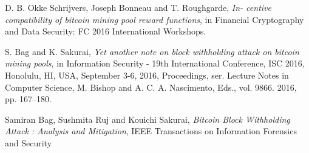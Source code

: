 \documentclass[12pt]{article}
\begin{document}
\begin{thebibliography}{9}
 D. B. Okke Schrijvers, Joseph Bonneau and T. Roughgarde,
 \textit{In- centive compatibility of bitcoin mining pool reward functions}, in Financial Cryptography and Data Security: FC 2016 International Workshops.

 S. Bag and K. Sakurai,
 \textit{Yet another note on block withholding attack on bitcoin mining pools}, in Information Security - 19th International Conference, ISC 2016, Honolulu, HI, USA, September 3-6, 2016, Proceedings, ser. Lecture Notes in Computer Science,
 M. Bishop and A. C. A. Nascimento, Eds., vol. 9866. 2016, pp. 167–180.

 Samiran Bag, Sushmita Ruj and Kouichi Sakurai,
 \textit{Bitcoin Block Withholding Attack : Analysis and
Mitigation},
IEEE Transactions on Information Forensics and Security


\end{thebibliography}
\end{document}
